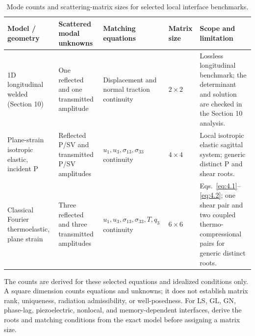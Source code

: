 \begin{table}[htbp]
\centering
\scriptsize
\setlength{\tabcolsep}{2.5pt}
\renewcommand{\arraystretch}{1.1}
\caption{Mode counts and scattering-matrix sizes for selected local interface benchmarks.}
\label{tab:T6-mode-counts}
\begin{tabularx}{\textwidth}{@{}p{2.7cm}p{2.45cm}p{3.15cm}p{1.45cm}X@{}}
\toprule
\textbf{Model / geometry} & \textbf{Scattered modal unknowns} & \textbf{Matching equations} & \textbf{Matrix size} & \textbf{Scope and limitation} \\
\midrule
1D longitudinal welded (Section 10) & One reflected and one transmitted amplitude & Displacement and normal traction continuity & $2\times2$ & Lossless longitudinal benchmark; the determinant and solution are checked in the Section 10 analysis. \\
Plane-strain isotropic elastic, incident P & Reflected P/SV and transmitted P/SV amplitudes & $u_1,u_3,\sigma_{13},\sigma_{33}$ continuity & $4\times4$ & Local isotropic elastic sagittal system; generic distinct P and shear roots. \\
Classical Fourier thermoelastic, plane strain & Three reflected and three transmitted amplitudes & $u_1,u_3,\sigma_{13},\sigma_{33},T,q_3$ continuity & $6\times6$ & Eqs.~\eqref{eq:4.1}--\eqref{eq:4.2}; one shear pair and two coupled thermo-compressional pairs for generic distinct roots. \\
\bottomrule
\end{tabularx}
\end{table}

\noindent\footnotesize{The counts are derived for these selected equations and idealized conditions only. A square dimension counts equations and unknowns; it does not establish matrix rank, uniqueness, radiation admissibility, or well-posedness. For LS, GL, GN, phase-lag, piezoelectric, nonlocal, and memory-dependent interfaces, derive the roots and matching conditions from the exact model before assigning a matrix size.}

